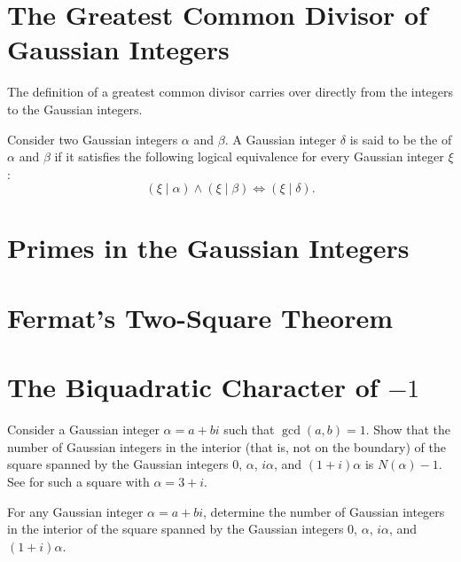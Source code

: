 \section{The Greatest Common Divisor of Gaussian Integers}

The definition of a greatest common divisor carries over directly from the integers to the Gaussian integers.

\begin{definition}
  Consider two Gaussian integers $\alpha$ and $\beta$. A Gaussian integer $\delta$ is said to be the  of $\alpha$ and $\beta$ if it satisfies the following logical equivalence for every Gaussian integer $\xi$:
  \begin{equation*}
    (\xi\mid \alpha)\land (\xi\mid\beta) \Leftrightarrow (\xi\mid\delta).
  \end{equation*}
\end{definition}

\section{Primes in the Gaussian Integers}

\section{Fermat's Two-Square Theorem}

\section{The Biquadratic Character of \texorpdfstring{$-1$}{-1}}

\exercises

\begin{challenge}
  \exercise
  \begin{subexenum}
  \item Consider a Gaussian integer $\alpha=a+bi$ such that $\gcd(a,b)=1$. Show that the number of Gaussian integers in the interior (that is, not on the boundary) of the square spanned by the Gaussian integers $0$, $\alpha$, $i\alpha$, and $(1+i)\alpha$ is $N(\alpha)-1$. See  for such a square with $\alpha=3+i$.
  \item For any Gaussian integer $\alpha=a+bi$, determine the number of Gaussian integers in the interior of the square spanned by the Gaussian integers $0$, $\alpha$, $i\alpha$, and $(1+i)\alpha$.
  \end{subexenum}
\end{challenge}

